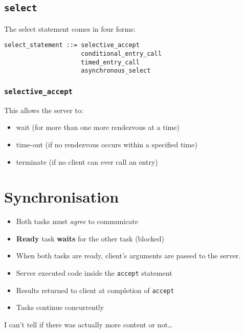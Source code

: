 \documentclass[11pt]{article}
\begin{document}
\subsection{\texttt{select}}
\label{sec:orge9b63ab}
The select statement comes in four forms:
\begin{verbatim}
select_statement ::= selective_accept
                     conditional_entry_call
                     timed_entry_call
                     asynchronous_select
\end{verbatim}
\subsubsection{\texttt{selective\_accept}}
\label{sec:org00b1dcc}
This allows the server to:
\begin{itemize}
\item wait (for more than one more rendezvous at a time)
\item time-out (if no rendezvous occurs within a specified time)
\item terminate (if no client can ever call an entry)
\end{itemize}

\section{Synchronisation}
\label{sec:org980b5bc}
\begin{itemize}
\item Both tasks must \emph{agree} to communicate
\item \textbf{Ready} task \textbf{waits} for the other task (blocked)
\item When both tasks are ready, client's arguments are passed to the server.
\item Server executed code inside the \texttt{accept} statement
\item Results returned to client at completion of \texttt{accept}
\item Tasks continue concurrently
\end{itemize}

I can't tell if there was actually more content or not\ldots{}
\end{document}
